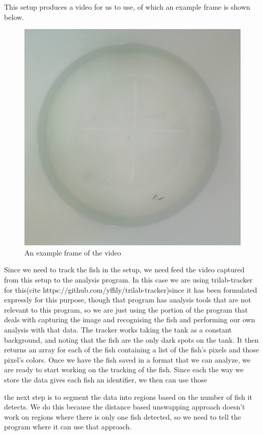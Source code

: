 \documentclass{article}
\begin{document}
This setup produces a video for us to use, of which an example frame is shown below.

\begin{figure}[H]
	\centering
	\includegraphics[width=.5\linewidth]{figures.frame5140}
	\caption{An example frame of the video}
\end{figure}

Since we need to track the fish in the setup, we need feed the video captured from this setup to the analysis program. In this case we are using trilab-tracker for this(cite https://github.com/yffily/trilab-tracker)since it has been formulated expressly for this purpose, though that program has analysis tools that are not relevant to this program, so we are just using the portion of the program that deals with capturing the image and recognising the fish and performing our own analysis with that data. The tracker works taking the tank as a constant background, and noting that the fish are the only dark spots on the tank. It then returns an array for each of the fish containing a list of the fish's pixels and those pixel's colors. Once we have the fish saved in a format that we can analyze, we are ready to start working on the tracking of the fish. Since each the way we store the data gives each fish an identifier, we then can use those 

the next step is to segment the data into regions based on the number of fish it detects. We do this because the distance based unswapping approach doesn't work on regions where there is only one fish detected, so we need to tell the program where it can use that approach.
\end{document}
